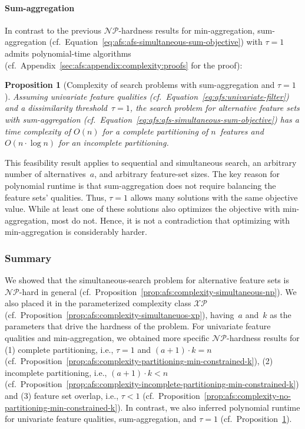 \documentclass{article}
\newtheorem{proposition}{Proposition}
\theoremstyle{definition}
\begin{document}
\paragraph{Sum-aggregation}

In contrast to the previous $\mathcal{NP}$-hardness results for min-aggregation, sum-aggregation (cf.~Equation~\ref{eq:afs:afs-simultaneous-sum-objective}) with $\tau=1$ admits polynomial-time algorithms (cf.~Appendix~\ref{sec:afs:appendix:complexity:proofs} for the proof):
%
\begin{proposition}[Complexity of search problems with sum-aggregation and $\tau=1$]
	Assuming univariate feature qualities (cf.~Equation~\ref{eq:afs:univariate-filter}) and a dissimilarity threshold~$\tau = 1$, the search problem for alternative feature sets with sum-aggregation (cf.~Equation~\ref{eq:afs:afs-simultaneous-sum-objective}) has a time complexity of $O(n)$ for a complete partitioning of $n$~features and $O(n \cdot \log n)$ for an incomplete partitioning.
	\label{prop:afs:complexity-partitioning-sum}
\end{proposition}
%
This feasibility result applies to sequential and simultaneous search, an arbitrary number of alternatives~$a$, and arbitrary feature-set sizes.
The key reason for polynomial runtime is that sum-aggregation does not require balancing the feature sets' qualities.
Thus, $\tau=1$ allows many solutions with the same objective value.
While at least one of these solutions also optimizes the objective with min-aggregation, most do not.
Hence, it is not a contradiction that optimizing with min-aggregation is considerably harder.

\subsubsection{Summary}
\label{sec:afs:approach:complexity:summary}

We showed that the simultaneous-search problem for alternative feature sets is $\mathcal{NP}$-hard in general (cf.~Proposition~\ref{prop:afs:complexity-simultaneous-np}).
We also placed it in the parameterized complexity class $\mathcal{XP}$ (cf.~Proposition~\ref{prop:afs:complexity-simultaneuos-xp}), having~$a$ and~$k$ as the parameters that drive the hardness of the problem.
For univariate feature qualities and min-aggregation, we obtained more specific $\mathcal{NP}$-hardness results for (1) complete partitioning, i.e., $\tau = 1$ and $(a+1) \cdot k = n$ (cf.~Proposition~\ref{prop:afs:complexity-partitioning-min-constrained-k}), (2) incomplete partitioning, i.e., $(a+1) \cdot k < n$ (cf.~Proposition~\ref{prop:afs:complexity-incomplete-partitioning-min-constrained-k}) and (3) feature set overlap, i.e., $\tau < 1$ (cf.~Proposition~\ref{prop:afs:complexity-no-partitioning-min-constrained-k}).
In contrast, we also inferred polynomial runtime for univariate feature qualities, sum-aggregation, and $\tau = 1$ (cf.~Proposition~\ref{prop:afs:complexity-partitioning-sum}).
\end{document}
